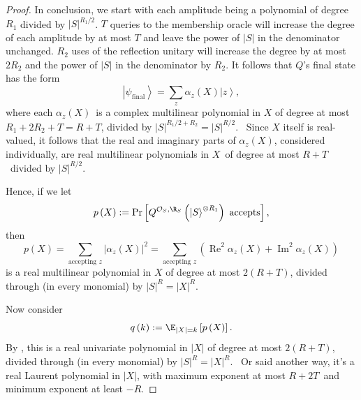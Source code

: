 \begin{proof}
In conclusion, we start with each amplitude being a polynomial of degree $R_1$ divided by $|S|^{R_1/2}$. $T$ queries to the membership oracle will increase the degree of each amplitude by at most $T$ and leave the power of $|S|$ in the denominator unchanged. $R_2$ uses of the reflection unitary will increase the degree by at most $2R_2$ and the power of $|S|$ in the denominator by $R_2$. It follows that $Q$'s final state has the form
\begin{equation}
\left\vert \psi_\mathrm{final}\right\rangle =\sum_z \alpha_{z}\left(  X\right)
\left\vert z\right\rangle ,
\end{equation}
where each $\alpha_{z}\left(  X\right)  $\ is a complex multilinear polynomial
in $X$ of degree at most $R_1+2R_2+T = R+T$, divided by $\left\vert S\right\vert
^{R_1/2+R_2} = |S|^{R/2}$. \ Since $X$ itself is real-valued, it follows that the real and
imaginary parts of $\alpha_{z}\left(  X\right)  $, considered individually,
are real multilinear polynomials in $X$\ of degree at most $R+T$\ divided by
$\left\vert S\right\vert ^{R/2}$.

Hence, if we let
\begin{equation}
p\left(  X\right)  :=\Pr\left[  Q^{\mathcal{O}_{S},\R_S}\left(  \left\vert
S\right\rangle ^{\otimes R_1}\right)  \text{ accepts}\right]  ,
\end{equation}
then
\begin{equation}
p\left(  X\right)  =\sum_{\text{accepting }z}\left\vert \alpha_{z}\left(
X\right)  \right\vert ^{2}=\sum_{\text{accepting }z}\left(  \operatorname{Re}
^{2}\alpha_{z}\left(  X\right)  +\operatorname{Im}^{2}\alpha_{z}\left(
X\right)  \right)
\end{equation}
is a real multilinear polynomial in $X$ of degree at most $2\left(
R+T\right)  $, divided through (in every monomial) by $\left\vert S\right\vert
^{R}=\left\vert X\right\vert ^{R}$.

Now consider
\begin{equation}
q\left(  k\right)  :=\E_{\left\vert X\right\vert =k}\left[
p\left(  X\right)  \right]  .
\end{equation}
By , this is a real univariate polynomial in $\left\vert
X\right\vert $ of degree at most $2\left(  R+T\right)  $, divided through (in
every monomial) by $\left\vert S\right\vert ^{R}=\left\vert X\right\vert ^{R}
$. \ Or said another way, it's a real Laurent polynomial in $\left\vert
X\right\vert $, with maximum exponent at most $R+2T$\ and minimum exponent at
least $-R$.
\end{proof}


